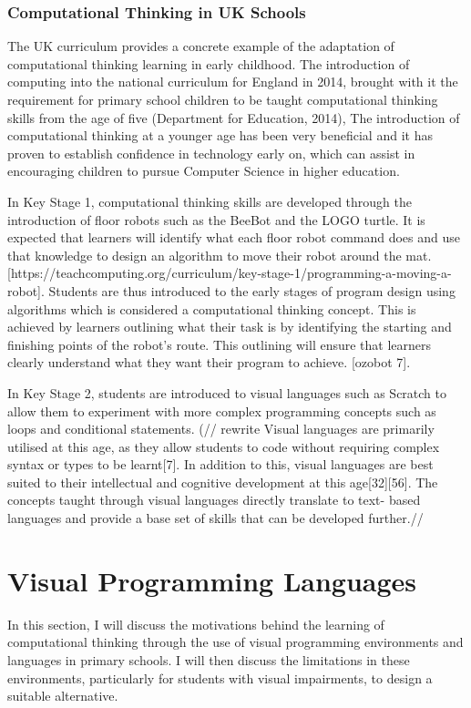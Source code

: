\documentclass[oneside,%
                    author={Malak Hajji},
                    degree={BSc},
                    title={Designing An Accessible Computational Toolkit For Students},
                  subtitle={With Mixed Visual Abilities}]{dissertation}
\begin{document}
\subsubsection{Computational Thinking in UK Schools}

The UK curriculum provides a concrete example of the adaptation of computational thinking learning in early childhood. The introduction of computing into the national curriculum for England in 2014, brought with it the requirement for primary school children to be taught computational thinking skills from the age of five (Department for Education, 2014), 
The introduction of computational thinking at a younger age has been very beneficial and it has proven to establish confidence in technology early on, which can assist in encouraging children to pursue Computer Science in higher education.

In Key Stage 1, computational thinking skills are developed through the introduction of floor robots such as the BeeBot and the LOGO turtle. It is expected that learners will identify what each floor robot command does and use that knowledge to design an algorithm to move their robot around the mat. [https://teachcomputing.org/curriculum/key-stage-1/programming-a-moving-a-robot]. Students are thus introduced to the early stages of program design using algorithms which is considered a computational thinking concept. This is achieved by learners outlining what their task is by identifying the starting and finishing points of the robot's route. This outlining will ensure that learners clearly understand what they want their program to achieve. [ozobot 7].

In Key Stage 2, students are introduced to visual languages such as Scratch to allow them to experiment with more complex programming concepts such as loops and conditional statements. (// rewrite Visual languages are primarily utilised at this age, as they allow students to code without requiring complex syntax or types to be learnt[7]. In addition to this, visual languages are best suited to their intellectual and cognitive development at this age[32][56]. The concepts taught through visual languages directly translate to text- based languages and provide a base set of skills that can be developed further.//

\section{Visual Programming Languages}

In this section, I will discuss the motivations behind the learning of computational thinking through the use of visual programming environments and languages in primary schools.
I will then discuss the limitations in these environments, particularly for students with visual impairments, to design a suitable alternative.
\end{document}

